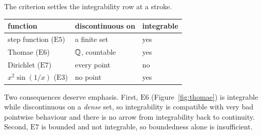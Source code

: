 The criterion settles the integrability row at a stroke.

\begin{center}
\begin{tabular}{@{}lll@{}}
\toprule
\textbf{function} & \textbf{discontinuous on} & \textbf{integrable} \\
\midrule
step function ($\mathrm{E}5$)   & a finite set       & yes \\
Thomae ($\mathrm{E}6$)          & $\mathbb{Q}$, countable    & yes \\
Dirichlet ($\mathrm{E}7$)       & every point        & no  \\
$x^2\sin(1/x)$ ($\mathrm{E}3$)  & no point           & yes \\
\bottomrule
\end{tabular}
\end{center}

\medskip
Two consequences deserve emphasis. First, $\mathrm{E}6$ (Figure~\ref{fig:thomae}) is integrable while
discontinuous on a \emph{dense} set, so integrability is compatible with very
bad pointwise behaviour and there is no arrow from integrability back to
continuity. Second, $\mathrm{E}7$ is bounded and not integrable, so
boundedness alone is insufficient.


